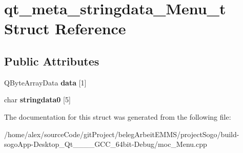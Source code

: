 \hypertarget{structqt__meta__stringdata__Menu__t}{\section{qt\-\_\-meta\-\_\-stringdata\-\_\-\-Menu\-\_\-t Struct Reference}
\label{structqt__meta__stringdata__Menu__t}
}
\subsection*{Public Attributes}
\begin{DoxyCompactItemize}
\item 
\hypertarget{structqt__meta__stringdata__Menu__t_a8e6deb74076811bbce6d977d09d57ba2}{Q\-Byte\-Array\-Data {\bfseries data} \mbox{[}1\mbox{]}}\label{structqt__meta__stringdata__Menu__t_a8e6deb74076811bbce6d977d09d57ba2}

\item 
\hypertarget{structqt__meta__stringdata__Menu__t_a510c428b4297648ab0eda9e777b2f1f5}{char {\bfseries stringdata0} \mbox{[}5\mbox{]}}\label{structqt__meta__stringdata__Menu__t_a510c428b4297648ab0eda9e777b2f1f5}

\end{DoxyCompactItemize}


The documentation for this struct was generated from the following file\-:\begin{DoxyCompactItemize}
\item 
/home/alex/source\-Code/git\-Project/beleg\-Arbeit\-E\-M\-M\-S/project\-Sogo/build-\/sogo\-App-\/\-Desktop\-\_\-\-Qt\-\_\-\_\-\_\-\_\-\-G\-C\-C\-\_\-64bit-\/\-Debug/moc\-\_\-\-Menu.\-cpp\end{DoxyCompactItemize}
